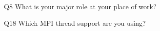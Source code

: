 \begin{description}%
\item{Q8} What is your major role at your place of work?%
\item{Q18} Which MPI thread support are you using?%
\end{description}%
